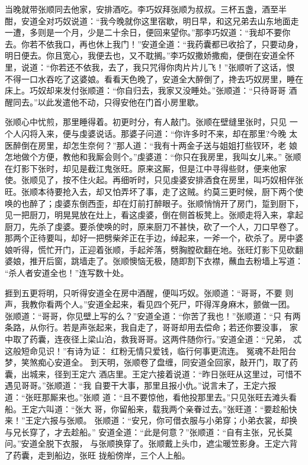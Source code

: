 当晚就带张顺同去他家，安排酒吃。李巧奴拜张顺为叔叔。三杯五盏，酒至半
酣，安道全对巧奴说道：“我今晚就你这里宿歇，明日早，和这兄弟去山东地面走
一遭，多则是一个月，少是二十余日，便回来望你。”那李巧奴道：“我却不要你
去。你若不依我口，再也休上我门！”安道全道：“我药囊都已收拾了，只要动身，
明日便去。你且宽心，我便去也，又不耽搁。”李巧奴撒娇撒痴，便倒在安道全怀
里，说道：“你若还不依我，去了，我只咒得你肉片片儿飞！”张顺听了这话，恨
不得一口水吞吃了这婆娘。看看天色晚了，安道全大醉倒了，搀去巧奴房里，睡在
床上。巧奴却来发付张顺道：“你自归去，我家又没睡处。”张顺道：“只待哥哥
酒醒同去。”以此发遣他不动，只得安他在门首小房里歇。

张顺心中忧煎，那里睡得着。初更时分，有人敲门。张顺在壁缝里张时，只见
一个人闪将入来，便与虔婆说话。那婆子问道：“你许多时不来，却在那里?今晚
太医醉倒在房里，却怎生奈何？”那人道：“我有十两金子送与姐姐打些钗环，老
娘怎地做个方便，教他和我厮会则个。”虔婆道：“你只在我房里，我叫女儿来。”
张顺在灯影下张时，却见是截江鬼张旺。原来这厮，但是江中寻得些财，便来他家
使。张顺见了，按不住火起。再细听时，只见虔婆安排酒食在房里，叫巧奴相伴张
旺。张顺本待要抢入去，却又怕弄坏了事，走了这贼。约莫三更时候，厨下两个使
唤的也醉了；虔婆东倒西歪，却在灯前打醉眼子。张顺悄悄开了房门，踅到厨下，
见一把厨刀，明晃晃放在灶上，看这虔婆，倒在侧首板凳上。张顺走将入来，拿起
厨刀，先杀了虔婆。要杀使唤的时，原来厨刀不甚快，砍了一个人，刀口早卷了。
那两个正待要叫，却好一把劈柴斧正在手边，绰起来，一斧一个，砍杀了。房中婆
娘听得，慌忙开门，正迎着张顺，手起斧落，劈胸膛砍翻在地。张旺灯影下见砍翻
婆娘，推开后窗，跳墙走了。张顺懊恼无极，随即割下衣襟，蘸血去粉墙上写道：
“杀人者安道全也！”连写数十处。

捱到五更将明，只听得安道全在房中酒醒，便叫巧奴。张顺道：“哥哥，不要
则声，我教你看两个人。”安道全起来，看见四个死尸，吓得浑身麻木，颤做一团。
张顺道：“哥哥，你见壁上写的么？”安道全道：“你苦了我也！”张顺道：“只
有两条路，从你行。若是声张起来，我自走了，哥哥却用去偿命；若还你要没事，
家中取了药囊，连夜径上梁山泊，救我哥哥。这两件随你行。”安道全道：“兄弟，
忒这般短命见识！”有诗为证：
红粉无情只爱钱，临行何事更流连。
冤魂不赴阳台梦，笑煞痴心安道全。
到天明，张顺卷了盘缠，同安道全回家，敲开门，取了药囊，出城来，径到王定六
酒店里。王定六接着说道：“昨日张旺从这里过，可惜不遇见哥哥。”张顺道：“我
自要干大事，那里且报小仇。”说言未了，王定六报道：“张旺那厮来也。”张顺
道：“且不要惊他，看他投那里去。”只见张旺去滩头看船。王定六叫道：“张大
哥，你留船来，载我两个亲眷过去。”张旺道：“要趁船快来！”王定六报与张顺。
张顺道：“安兄，你可借衣服与小弟穿；小弟衣裳，却换与兄长穿了，才去趁船。”
安道全道：“此是何意？”张顺道：“自有主张，兄长莫问。”安道全脱下衣服，
与张顺换穿了。张顺戴上头巾，遮尘暖笠影身。王定六背了药囊，走到船边，张旺
拢船傍岸，三个人上船。


